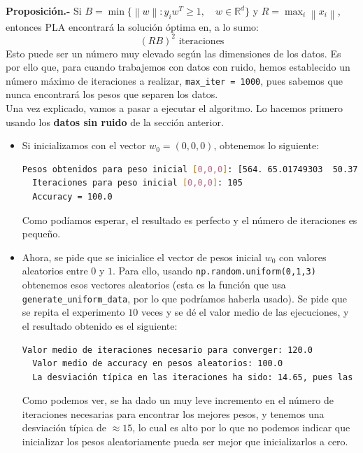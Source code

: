 \documentclass[12pt]{article}
\begin{document}
{\newcommand{\norm}[1]{\left\lVert#1\right\rVert}

\textbf{Proposición.-} Si $B = \min \{ \norm{w} : y_i w^T \geq 1,\quad w \in \mathbb R^d\}$ y $R = \max_{i} \norm{x_i}$, entonces PLA encontrará la solución óptima en, a lo sumo:
$$
(RB)^2 \text{ iteraciones}
$$
Esto puede ser un número muy elevado según las dimensiones de los datos. Es por ello que, para cuando trabajemos con datos con ruido, hemos establecido un número máximo de iteraciones a realizar, \lstinline{max_iter = 1000}, pues sabemos que nunca encontrará los pesos que separen los datos.\\



Una vez explicado, vamos a pasar a ejecutar el algoritmo. Lo hacemos primero usando los \textbf{datos sin ruido} de la sección anterior.
\begin{itemize}
\item Si inicializamos con el vector $w_0 = (0,0,0)$, obtenemos lo siguiente:
\begin{lstlisting}[language=bash]
  Pesos obtenidos para peso inicial [0,0,0]: [564. 65.01749303  50.37298718]
  Iteraciones para peso inicial [0,0,0]: 105
  Accuracy = 100.0
\end{lstlisting}
Como podíamos esperar, el resultado es perfecto y el número de iteraciones es pequeño.

\item Ahora, se pide que se inicialice el vector de pesos inicial $w_0$ con valores aleatorios entre $0$ y $1$. Para ello, usando \lstinline{np.random.uniform(0,1,3)} obtenemos esos vectores aleatorios (esta es la función que usa \lstinline{generate_uniform_data}, por lo que podríamos haberla usado). Se pide que se repita el experimento $10$ veces y se dé el valor medio de las ejecuciones, y el resultado obtenido es el siguiente:
\begin{lstlisting}[language=bash]
  Valor medio de iteraciones necesario para converger: 120.0
  Valor medio de accuracy en pesos aleatorios: 100.0
  La desviación típica en las iteraciones ha sido: 14.65, pues las iteraciones son: [97, 134, 134, 108, 111, 121, 150, 116, 111, 118]
\end{lstlisting}
Como podemos ver, se ha dado un muy leve incremento en el número de iteraciones necesarias para encontrar los mejores pesos, y tenemos una desviación típica de $\approx 15$, lo cual es alto por lo que no podemos indicar que inicializar los pesos aleatoriamente pueda ser mejor que inicializarlos a cero.
\end{itemize}

}
\end{document}
